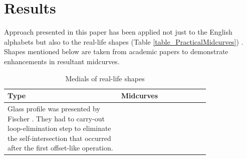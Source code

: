 \section{Results}

Approach presented in this paper has been applied not just to the English alphabets but also to the real-life shapes (Table \ref{table_PracticalMidcurves}) . Shapes mentioned below are taken from academic papers to demonstrate enhancements in resultant midcurves.


\begin{table}[htb]
\caption{Medials of real-life shapes}
\begin{tabular}[htb]{@{}p{0.45\linewidth} p{0.35\linewidth}@{}}
\toprule
{\bf Type } & {\bf Midcurves}\\
\midrule
Glass profile was presented by Fischer \cite{Elber1999}. They had to carry-out loop-elimination step to eliminate the self-intersection that occurred after the first offset-like operation. &

\end{tabular}
\end{table}
